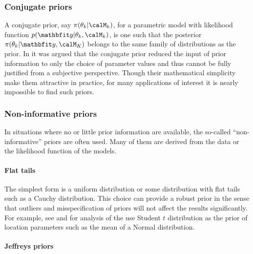 \subsubsection{Conjugate priors}
\label{ssub:Conjugate priors}

A conjugate prior, say $\pi(\theta_k|\calM_k)$, for a parametric model with
likelihood function $p(\data|\theta_k,\calM_k)$, is one such that the
posterior $\pi(\theta_k|\data,\calM_K)$ belongs to the same family of
distributions as the prior. In \cite[][sec.~5.2]{Bernardo:1994vd} it was
argued that the conjugate prior reduced the input of prior information to only
the choice of parameter values and thus cannot be fully justified from a
subjective perspective. Though their mathematical simplicity make them
attractive in practice, for many applications of interest it is nearly
impossible to find such priors.

\subsubsection{Non-informative priors}
\label{ssub:Non-informative priors}

In situations where no or little prior information are available, the
so-called ``non-informative'' priors are often used. Many of them are derived
from the data or the likelihood function of the models.

\paragraph{Flat tails}

The simplest form is a uniform distribution or some distribution with flat
tails such as a Cauchy distribution. This choice can provide a robust prior in
the sense that outliers and misspecification of priors will not affect the
results significantly. For example, see \cite{OHagan:1990vx} and
\cite{Fan:1992vx} for analysis of the use Student $t$ distribution as the
prior of location parameters such as the mean of a Normal distribution.

\paragraph{Jeffreys priors}

